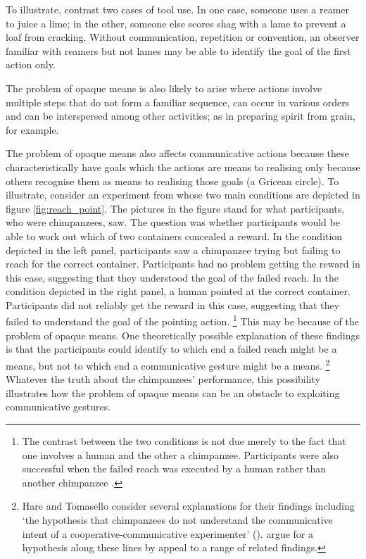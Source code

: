 \documentclass[12pt,\papersize]{extarticle}
\begin{document}
To illustrate, contrast two cases of tool use.
In one case, someone uses a reamer to  juice  a lime; in the other, someone else scores shag with a lame to prevent a loaf from cracking.
Without communication, repetition or convention,
an observer familiar with reamers but not lames 
may be able to identify the goal of the first action only.

The problem of opaque means is also likely to arise where actions involve multiple steps that do not form a familiar sequence, can occur in various orders and can be interspersed among other activities;
as in preparing spirit from grain, for example.

The problem of opaque means also affects communicative actions 
 because these characteristically have  goals which the actions are means to realising only because others recognise them as means to realising those goals (a Gricean circle). 
To illustrate, consider an experiment from 
\citet[][experiment 3]{hare_chimpanzees_2004}
 whose two main conditions are depicted in figure \vref{fig:reach_point}.
The pictures in the figure stand for what participants, who were chimpanzees, saw.
The question was whether participants would be able to work out which of two containers concealed a reward.
In the condition depicted in the left panel, participants saw a chimpanzee trying but failing to reach for the correct container. 
Participants had no problem getting the reward in this case, suggesting that they understood the goal of the failed reach.
In the condition depicted in the right panel, a human pointed at the correct container.
Participants did not reliably  get the reward in this case, suggesting that they failed to understand the goal of the pointing action.%
\footnote{
The contrast between the two conditions is not due merely to the fact that one involves a human and the other a chimpanzee.
Participants were also successful when the failed reach was executed by a human rather than another chimpanzee \citep[][experiment 1]{hare_chimpanzees_2004}. 
}
This may be because of the problem of opaque means.
One theoretically possible explanation of these findings is that the participants could identify to which end a failed reach might be a means, but not to which end a communicative gesture might be a means.%
\footnote{\label{fn:communicative_intention}%
Hare and Tomasello 
consider several explanations for their findings including `the hypothesis that chimpanzees do not understand the communicative intent of a cooperative-communicative experimenter' (\citeyear[p.\ 580]{hare_chimpanzees_2004}).
\citet[pp.\ 5--7]{Moll:2007gu} argue for a hypothesis along these lines by appeal to a range of related findings.
}
Whatever the truth about the chimpanzees' performance,
this possibility illustrates how the problem of opaque means can be an obstacle to exploiting communicative gestures.
\end{document}
